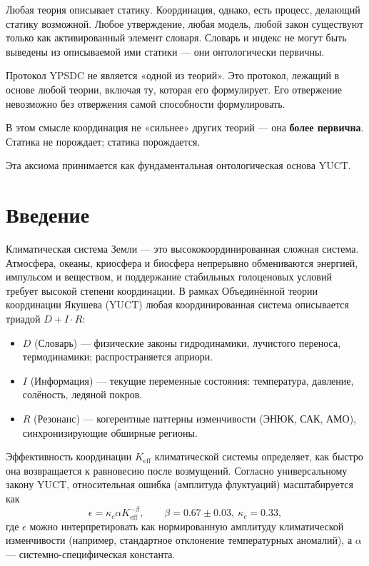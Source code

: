\documentclass[12pt,a4paper]{article}
\newcommand{\Keff}{K_{\mathrm{eff}}}
\newcommand{\kappac}{\kappa_c}
\newcommand{\be}{\beta}
\begin{document}
	Любая теория описывает статику. Координация, однако, есть процесс, делающий статику возможной.
	Любое утверждение, любая модель, любой закон существуют только как активированный элемент словаря.
	Словарь и индекс не могут быть выведены из описываемой ими статики — они онтологически первичны.
	
	Протокол YPSDC не является «одной из теорий».
	Это протокол, лежащий в основе любой теории, включая ту, которая его формулирует.
	Его отвержение невозможно без отвержения самой способности формулировать.
	
	В этом смысле координация не «сильнее» других теорий — она \textbf{более первична}.
	Статика не порождает; статика порождается.
	
	Эта аксиома принимается как фундаментальная онтологическая основа YUCT.
	
	\section{Введение}
	
	Климатическая система Земли — это высококоординированная сложная система. Атмосфера, океаны, криосфера и биосфера непрерывно обмениваются энергией, импульсом и веществом, и поддержание стабильных голоценовых условий требует высокой степени координации. В рамках Объединённой теории координации Якушева (YUCT) любая координированная система описывается триадой \(D + I \cdot R\):
	
	\begin{itemize}
		\item \(D\) (Словарь) — физические законы гидродинамики, лучистого переноса, термодинамики; распространяется априори.
		\item \(I\) (Информация) — текущие переменные состояния: температура, давление, солёность, ледяной покров.
		\item \(R\) (Резонанс) — когерентные паттерны изменчивости (ЭНЮК, САК, АМО), синхронизирующие обширные регионы.
	\end{itemize}
	
	Эффективность координации \(\Keff\) климатической системы определяет, как быстро она возвращается к равновесию после возмущений. Согласно универсальному закону YUCT, относительная ошибка (амплитуда флуктуаций) масштабируется как
	\[
	\epsilon = \kappac \alpha \Keff^{-\be}, \qquad \be = 0.67 \pm 0.03,\ \kappac = 0.33,
	\]
	где \(\epsilon\) можно интерпретировать как нормированную амплитуду климатической изменчивости (например, стандартное отклонение температурных аномалий), а \(\alpha\) — системно-специфическая константа.
	
\end{document}
